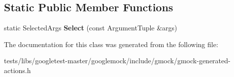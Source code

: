 \subsection*{Static Public Member Functions}
\begin{DoxyCompactItemize}
\item 
\mbox{\label{classtesting_1_1internal_1_1SelectArgs_3_01Result_00_01ArgumentTuple_00_01k1_00_01k2_00_01k3_00_5bf9522b4f7bab9048d7587f1d9fbf27_a3f3b801b32c8cb88c31bc39cf0e25bb7}} 
static Selected\+Args {\bfseries Select} (const Argument\+Tuple \&args)
\end{DoxyCompactItemize}


The documentation for this class was generated from the following file\+:\begin{DoxyCompactItemize}
\item 
tests/libs/googletest-\/master/googlemock/include/gmock/gmock-\/generated-\/actions.\+h\end{DoxyCompactItemize}
